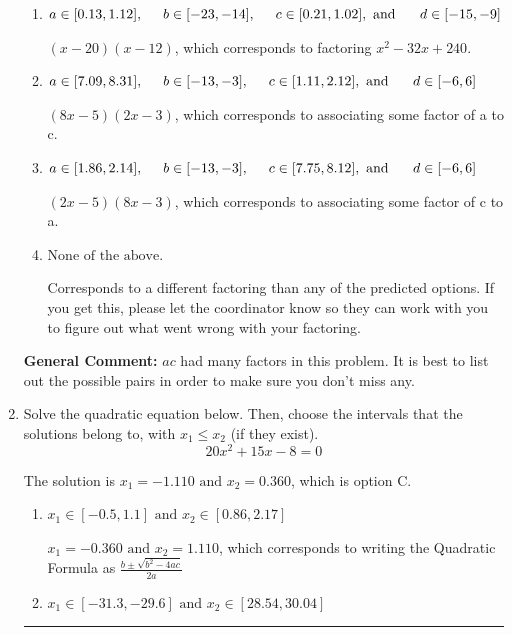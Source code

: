 \documentclass{extbook}[14pt]
\newcommand{\litem}[1]{\item #1

\rule{\textwidth}{0.4pt}}
\begin{document}
\begin{enumerate}
{\begin{enumerate}[label=\Alph*.]
* $(4x -5)(4x -3)$, which is the correct option.
\item \( a \in [0.13, 1.12], \hspace*{5mm} b \in [-23, -14], \hspace*{5mm} c \in [0.21, 1.02], \text{ and } \hspace*{5mm} d \in [-15, -9] \)

 $(x -20)(x -12)$, which corresponds to factoring $x^{2} -32 x + 240$.
\item \( a \in [7.09, 8.31], \hspace*{5mm} b \in [-13, -3], \hspace*{5mm} c \in [1.11, 2.12], \text{ and } \hspace*{5mm} d \in [-6, 6] \)

 $(8x -5)(2x -3)$, which corresponds to associating some factor of a to c.
\item \( a \in [1.86, 2.14], \hspace*{5mm} b \in [-13, -3], \hspace*{5mm} c \in [7.75, 8.12], \text{ and } \hspace*{5mm} d \in [-6, 6] \)

 $(2x -5)(8x -3)$, which corresponds to associating some factor of c to a.
\item \( \text{None of the above.} \)

 Corresponds to a different factoring than any of the predicted options. If you get this, please let the coordinator know so they can work with you to figure out what went wrong with your factoring.
\end{enumerate}

\textbf{General Comment:} $ac$ had many factors in this problem. It is best to list out the possible pairs in order to make sure you don't miss any.
}
\litem{
Solve the quadratic equation below. Then, choose the intervals that the solutions belong to, with $x_1 \leq x_2$ (if they exist).
\[ 20x^{2} +15 x -8 = 0 \]

The solution is \( x_1 = -1.110 \text{ and } x_2 = 0.360 \), which is option C.\begin{enumerate}[label=\Alph*.]
\item \( x_1 \in [-0.5, 1.1] \text{ and } x_2 \in [0.86, 2.17] \)

 $x_1 = -0.360 \text{ and } x_2 = 1.110$, which corresponds to writing the Quadratic Formula as $\frac{b \pm \sqrt{b^2 - 4ac}}{2a}$
\item \( x_1 \in [-31.3, -29.6] \text{ and } x_2 \in [28.54, 30.04] \)


\end{enumerate}}
\end{enumerate}
\end{document}
